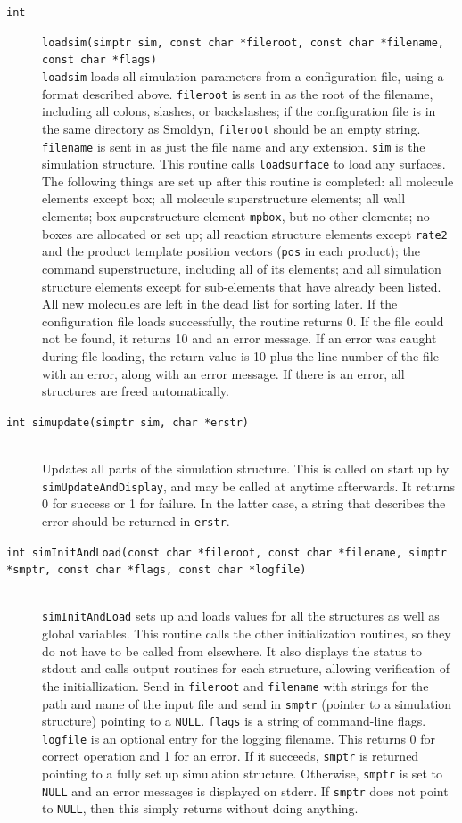 \documentclass {scrbook}
\newcommand {\ttt} {\texttt}
\begin{document}
\begin{description}
\item[\ttt{int}]
\ttt{loadsim(simptr sim, const char *fileroot, const char *filename, const char *flags)}
\hfill \\
\ttt{loadsim} loads all simulation parameters from a configuration file, using a format described above. \ttt{fileroot} is sent in as the root of the filename, including all colons, slashes, or backslashes; if the configuration file is in the same directory as Smoldyn, \ttt{fileroot} should be an empty string. \ttt{filename} is sent in as just the file name and any extension. \ttt{sim} is the simulation structure. This routine calls \ttt{loadsurface} to load any surfaces. The following things are set up after this routine is completed: all molecule elements except box; all molecule superstructure elements; all wall elements; box superstructure element \ttt{mpbox}, but no other elements; no boxes are allocated or set up; all reaction structure elements except \ttt{rate2} and the product template position vectors (\ttt{pos} in each product); the command superstructure, including all of its elements; and all simulation structure elements except for sub-elements that have already been listed. All new molecules are left in the dead list for sorting later. If the configuration file loads successfully, the routine returns 0. If the file could not be found, it returns 10 and an error message. If an error was caught during file loading, the return value is 10 plus the line number of the file with an error, along with an error message. If there is an error, all structures are freed automatically.

\item[\ttt{int simupdate(simptr sim, char *erstr)}]
\hfill \\
Updates all parts of the simulation structure. This is called on start up by \ttt{simUpdateAndDisplay}, and may be called at anytime afterwards. It returns 0 for success or 1 for failure. In the latter case, a string that describes the error should be returned in \ttt{erstr}.

\item[\ttt{int simInitAndLoad(const char *fileroot, const char *filename, simptr *smptr, const char *flags, const char *logfile)}]
\hfill \\
\ttt{simInitAndLoad} sets up and loads values for all the structures as well as global variables. This routine calls the other initialization routines, so they do not have to be called from elsewhere. It also displays the status to stdout and calls output routines for each structure, allowing verification of the initiallization. Send in \ttt{fileroot} and \ttt{filename} with strings for the path and name of the input file and send in \ttt{smptr} (pointer to a simulation structure) pointing to a \ttt{NULL}. \ttt{flags} is a string of command-line flags. \ttt{logfile} is an optional entry for the logging filename. This returns 0 for correct operation and 1 for an error. If it succeeds, \ttt{smptr} is returned pointing to a fully set up simulation structure. Otherwise, \ttt{smptr} is set to \ttt{NULL} and an error messages is displayed on stderr. If \ttt{smptr} does not point to \ttt{NULL}, then this simply returns without doing anything.


\end{description}
\end{document}
